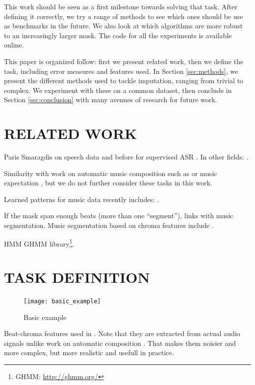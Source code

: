 \documentclass{article}
\begin{document}
This work should be seen as a first milestone towards solving that task.
After defining it correctly, we try a range of methods to see which ones should
be use as benchmarks in the future. We also look at which algorithms are more robust
to an increasingly larger mask. The code for all the experiments is available
online.

This paper is organized follow: first we present related work, then we define the
task, including error measures and features used. In Section \ref{sec:methods},
we present the different methods used to tackle imputation, ranging from trivial
to complex. We experiment with these on a common dataset, then conclude in
Section \ref{sec:conclusion} with many avenues of research for future work.


\section{RELATED WORK}
\label{sec:relatedwork}

Paris Smaragdis on speech data \cite{Smaragdis2009} and
before for supervised ASR \cite{Morris1998}.
In other fields: \cite{Oba2003}.

Similarity with work on automatic music composition such as \cite{Todd1989,Mozer1994a,Eck2002d} or music
expectation \cite{Hazan2010}, but we do not further consider these tasks in this work.

Learned patterns for music data recently includes: \cite{Bertin-Mahieux2010a,Casey2007,Weiss2010}.

If the mask span enough beats (more than one ``segment''), links with music segmentation.
Music segmentation based on chroma features include \cite{Weiss2010,Levy2008,Mauch2009}.

HMM \cite{Rabiner1989} GHMM library\footnote{GHMM: \url{http://ghmm.org/}}.

\section{TASK DEFINITION}
\label{sec:task}

\begin{figure}[t]
\begin{center}
\texttt{[image: basic\_example]}
\end{center}
\caption{Basic example}
\label{fig:code}
\end{figure}

Beat-chroma features used in \cite{Ellis2007a}.
Note that they are extracted from actual audio signals unlike work on automatic composition
\cite{Eck2002d}. That makes them noisier and more complex, but more realistic and usefull
in practice.
\end{document}
